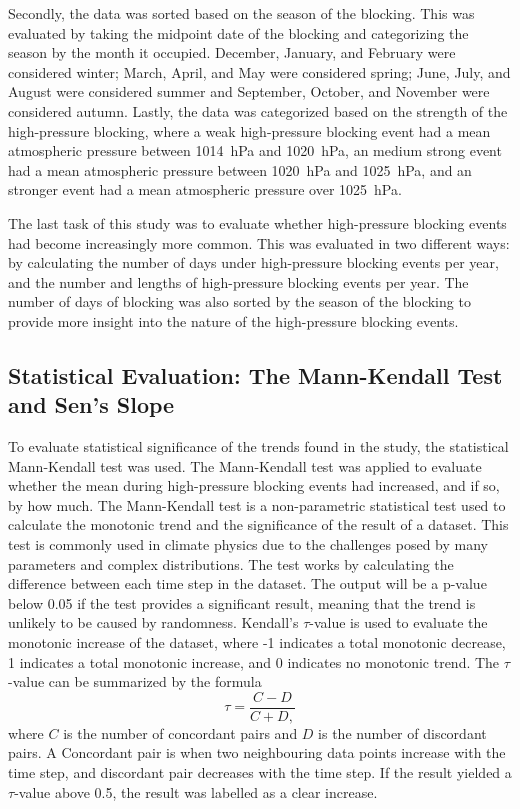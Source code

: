 Secondly, the data was sorted based on the season of the blocking. This was evaluated by taking the midpoint date of the blocking and categorizing the season by the month it occupied. December, January, and February were considered winter; March, April, and May were considered spring; June, July, and August were considered summer and September, October, and November were considered autumn. Lastly, the data was categorized based on the strength of the high-pressure blocking, where a weak high-pressure blocking event had a mean atmospheric pressure between \SI{1014}{\hecto\pascal} and \SI{1020}{\hecto\pascal}, an medium strong event had a mean atmospheric pressure between \SI{1020}{\hecto\pascal} and \SI{1025}{\hecto\pascal}, and an stronger event had a mean atmospheric pressure over \SI{1025}{\hecto\pascal}.

The last task of this study was to evaluate whether high-pressure blocking events had become increasingly more common. This was evaluated in two different ways: by calculating the number of days under high-pressure blocking events per year, and the number and lengths of high-pressure blocking events per year. The number of days of blocking was also sorted by the season of the blocking to provide more insight into the nature of the high-pressure blocking events. 

\newpage
\subsection{Statistical Evaluation: The Mann-Kendall Test and Sen's Slope}
To evaluate statistical significance of the trends found in the study, the statistical Mann-Kendall test was used. The Mann-Kendall test was applied to evaluate whether the \PM mean during high-pressure blocking events had increased, and if so, by how much. The Mann-Kendall test is a non-parametric statistical test used to calculate the monotonic trend and the significance of the result of a dataset. This test is commonly used in climate physics due to the challenges posed by many parameters and complex distributions. The test works by calculating the difference between each time step in the dataset. The output will be a p-value below 0.05 if the test provides a significant result, meaning that the trend is unlikely to be caused by randomness. Kendall's $\tau$-value is used to evaluate the monotonic increase of the dataset, where -1 indicates a total monotonic decrease, 1 indicates a total monotonic increase, and 0 indicates no monotonic trend. The $\tau$-value can be summarized by the formula 
\begin{equation}
    \tau = \frac{C - D}{C + D,}
    \label{eq:Kendalltau}
\end{equation}
where $C$ is the number of concordant pairs and $D$ is the number of discordant pairs. A Concordant pair is when two neighbouring data points increase with the time step, and discordant pair decreases with the time step. If the result yielded a $\tau$-value above 0.5, the result was labelled as a clear increase. 

